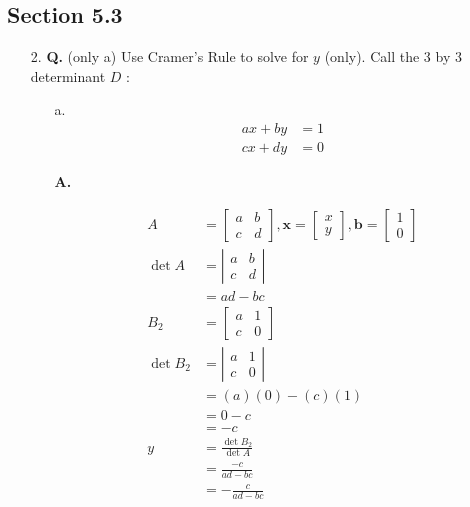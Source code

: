 \documentclass[main.tex]{subfiles}
\begin{document}
\subsection{Section 5.3}
\begin{enumerate}
    \item [2.] \textbf{Q.} (only a) Use Cramer's Rule to solve for $y$ (only). Call the 3 by 3 determinant $D$ :
    \begin{enumerate}
        \item [a.] 
            $$
            \begin{aligned}
            a x+b y &= 1\\
            c x+d y &=0
            \end{aligned}
            $$
            
            \textbf{A.}
            
            $$
            \begin{aligned}
            A&=\left[\begin{array}{ll}
            a & b \\
            c & d
            \end{array}\right], \mathbf{x}=\left[\begin{array}{l}
            x \\
            y
            \end{array}\right], \mathbf{b}=\left[\begin{array}{l}
            1 \\
            0
            \end{array}\right]\\
            \operatorname{det} A &=\left|\begin{array}{ll}
            a & b \\
            c & d
            \end{array}\right| \\
            &=a d-b c\\
            B_{2}&=\left[\begin{array}{ll}
            a & 1 \\
            c & 0
            \end{array}\right]\\
            \operatorname{det} B_{2} &=\left|\begin{array}{ll}
            a & 1 \\
            c & 0
            \end{array}\right| \\
            &=(a)(0)-(c)(1) \\
            &=0-c \\
            &=-c \\
            y &=\frac{\operatorname{det} B_{2}}{\operatorname{det} A} \\
            &=\frac{-c}{a d-b c} \\
            &=-\frac{c}{a d-b c}
            \end{aligned}
            $$
            

\end{enumerate}
\end{enumerate}
\end{document}
